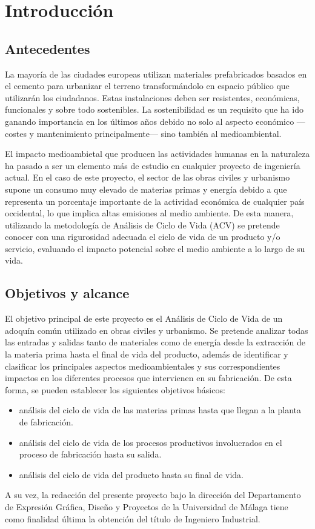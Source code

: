 \chapter{Introducción}
\section{Antecedentes}

La mayoría de las ciudades europeas utilizan materiales prefabricados basados en el cemento para urbanizar el terreno transformándolo en espacio público que utilizarán los ciudadanos. Estas instalaciones deben ser resistentes, económicas, funcionales y sobre todo sostenibles. La sostenibilidad es un requisito que ha ido ganando importancia en los últimos años debido no solo al aspecto económico —costes y mantenimiento principalmente— sino también al medioambiental.

El impacto medioambietal que producen las actividades humanas en la naturaleza ha pasado a ser un elemento más de estudio en cualquier proyecto de ingeniería actual. En el caso de este proyecto, el sector de las obras civiles y urbanismo supone un consumo muy elevado de materias primas y energía debido a que representa un porcentaje importante de la actividad económica de cualquier país occidental, lo que implica altas emisiones al medio ambiente.
De esta manera, utilizando la metodología de Análisis de Ciclo de Vida (ACV) se pretende conocer con una rigurosidad adecuada el ciclo de vida de un producto y/o servicio, evaluando el impacto potencial sobre el medio ambiente a lo largo de su vida.

\section{Objetivos y alcance}
El objetivo principal de este proyecto es el Análisis de Ciclo de Vida de un adoquín común utilizado en obras civiles y urbanismo. Se pretende analizar todas las entradas y salidas tanto de materiales como de energía desde la extracción de la materia prima hasta el final de vida del producto, además de identificar y clasificar los principales aspectos medioambientales y sus correspondientes impactos en los diferentes procesos que intervienen en su fabricación. De esta forma, se pueden establecer los siguientes objetivos básicos:
\begin{itemize}
\item análisis del ciclo de vida de las materias primas hasta que llegan a la planta de fabricación.
\item análisis del ciclo de vida de los procesos productivos involucrados en el proceso de fabricación hasta su salida.
\item análisis del ciclo de vida del producto hasta su final de vida.
\end{itemize}

A su vez, la redacción del presente proyecto bajo la dirección del Departamento de Expresión Gráfica, Diseño y Proyectos de la Universidad de Málaga tiene como finalidad última la obtención del título de Ingeniero Industrial.
